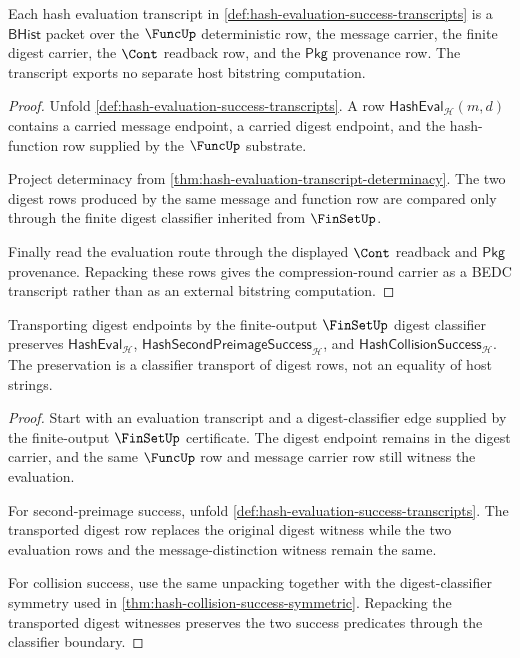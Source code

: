 \begin{theorem}
\label{thm:hash-compression-round-carrier}
Each hash evaluation transcript in \autoref{def:hash-evaluation-success-transcripts} is a $\mathsf{BHist}$ packet over the $\FuncUp$ deterministic row, the message carrier, the finite digest carrier, the $\Cont$ readback row, and the $\mathsf{Pkg}$ provenance row. The transcript exports no separate host bitstring computation.
\end{theorem}
\begin{proof}
Unfold \autoref{def:hash-evaluation-success-transcripts}. A row $\mathsf{HashEval}_{\mathcal H}(m,d)$ contains a carried message endpoint, a carried digest endpoint, and the hash-function row supplied by the $\FuncUp$ substrate.

Project determinacy from \autoref{thm:hash-evaluation-transcript-determinacy}. The two digest rows produced by the same message and function row are compared only through the finite digest classifier inherited from $\FinSetUp$.

Finally read the evaluation route through the displayed $\Cont$ readback and $\mathsf{Pkg}$ provenance. Repacking these rows gives the compression-round carrier as a BEDC transcript rather than as an external bitstring computation.
\end{proof}

\begin{theorem}
\label{thm:hash-digest-classifier-stability}
Transporting digest endpoints by the finite-output $\FinSetUp$ digest classifier preserves $\mathsf{HashEval}_{\mathcal H}$, $\mathsf{HashSecondPreimageSuccess}_{\mathcal H}$, and $\mathsf{HashCollisionSuccess}_{\mathcal H}$. The preservation is a classifier transport of digest rows, not an equality of host strings.
\end{theorem}
\begin{proof}
Start with an evaluation transcript and a digest-classifier edge supplied by the finite-output $\FinSetUp$ certificate. The digest endpoint remains in the digest carrier, and the same $\FuncUp$ row and message carrier row still witness the evaluation.

For second-preimage success, unfold \autoref{def:hash-evaluation-success-transcripts}. The transported digest row replaces the original digest witness while the two evaluation rows and the message-distinction witness remain the same.

For collision success, use the same unpacking together with the digest-classifier symmetry used in \autoref{thm:hash-collision-success-symmetric}. Repacking the transported digest witnesses preserves the two success predicates through the classifier boundary.
\end{proof}

